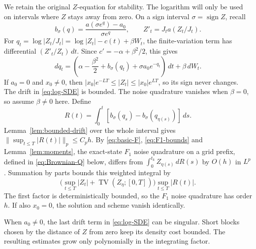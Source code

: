 \documentclass[11pt]{article}
\theoremstyle{remark}
\newcommand{\abs}[1]{\lvert#1\rvert}
\DeclareMathOperator{\TV}{TV}
\begin{document}
We retain the original \(Z\)-equation for stability.
The logarithm will only be used on intervals where \(Z\) stays away
from zero. On a sign interval \(\sigma=\operatorname{sign}Z\), recall
\[
 b_\sigma(q)=\frac{a(\sigma e^q)-a_0}{\sigma e^q},
 \qquad Z'_t=J_ta(Z_t/J_t).
\]
For \(q_t=\log\abs{Z_t/J_t}=\log\abs{Z_t}-c(t)+\beta W_t\),
the finite-variation term has differential \((Z'_t/Z_t)\,dt\).
Since \(c'=-\alpha+\beta^2/2\), this gives
\begin{equation}\label{eq:log-SDE}
 dq_t=\left(\alpha-\frac{\beta^2}{2}
          +b_\sigma(q_t)+\sigma a_0e^{-q_t}\right)\,dt
          +\beta\,dW_t.
\end{equation}
If \(a_0=0\) and \(x_0\ne0\), then
\(\abs{x_0}e^{-LT}\le\abs{Z_t}\le\abs{x_0}e^{LT}\), so its sign
never changes. The drift in \eqref{eq:log-SDE} is bounded.
The noise quadrature vanishes when \(\beta=0\), so assume \(\beta\ne0\) here.
Define
\[
 R(t)=\int_0^t[b_\sigma(q_s)-b_\sigma(q_{\eta(s)})]\,ds .
\]
Lemma~\ref{lem:bounded-drift} over the whole interval gives
\(\|\sup_{t\le T}|R(t)|\|_p\le C_ph\).
By \eqref{eq:basic-F}, \eqref{eq:F1-bounds} and
Lemma~\ref{lem:moments}, the exact-state \(F_1\) noise quadrature on a
grid prefix, defined in \eqref{eq:Brownian-Q} below, differs from
\(\int_0^{t_k}Z_{\eta(s)}\,dR(s)\) by \(O(h)\) in \(L^p\).
Summation by parts bounds this weighted integral by
\[
 \bigl(\sup_{t\le T}|Z_t|+\TV(Z_\eta;[0,T])\bigr)
       \sup_{t\le T}|R(t)|.
\]
The first factor is deterministically bounded, so the \(F_1\) noise
quadrature has order \(h\). If also \(x_0=0\), the solution and scheme
vanish identically.

When \(a_0\ne0\), the last drift term in \eqref{eq:log-SDE} can be
singular. Short blocks chosen by the distance of \(Z\) from zero
keep its density cost bounded. The resulting estimates grow only
polynomially in the integrating factor.
\end{document}
